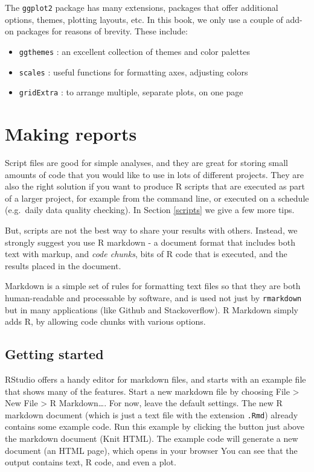 \documentclass[]{book}
\providecommand{\tightlist}{%
  \setlength{\itemsep}{0pt}\setlength{\parskip}{0pt}}
\begin{document}
The \texttt{ggplot2} package has many extensions, packages that offer additional options, themes, plotting layouts, etc. In this book, we only use a couple of add-on packages for reasons of brevity. These include:

\begin{itemize}
\tightlist
\item
  \texttt{ggthemes} : an excellent collection of themes and color palettes
\item
  \texttt{scales} : useful functions for formatting axes, adjusting colors
\item
  \texttt{gridExtra} : to arrange multiple, separate plots, on one page
\end{itemize}

\hypertarget{rmarkdown}{%
\section{Making reports}\label{rmarkdown}}

Script files are good for simple analyses, and they are great for storing small amounts of code that you would like to use in lots of different projects. They are also the right solution if you want to produce R scripts that are executed as part of a larger project, for example from the command line, or executed on a schedule (e.g.~daily data quality checking). In Section \ref{scripts} we give a few more tips.

But, scripts are not the best way to share your results with others. Instead, we strongly suggest you use R markdown - a document format that includes both text with markup, and \emph{code chunks}, bits of R code that is executed, and the results placed in the document.

Markdown is a simple set of rules for formatting text files so that they are both human-readable and processable by software, and is used not just by \texttt{rmarkdown} but in many applications (like Github and Stackoverflow). R Markdown simply adds R, by allowing code chunks with various options.

\hypertarget{getting-started}{%
\subsection{Getting started}\label{getting-started}}

RStudio offers a handy editor for markdown files, and starts with an example file that shows many of the features. Start a new markdown file by choosing File \textgreater{} New File \textgreater{} R Markdown\ldots{}. For now, leave the default settings. The new R markdown document (which is just a text file with the extension \texttt{.Rmd}) already contains some example code. Run this example by clicking the button just above the markdown document (Knit HTML). The example code will generate a new document (an HTML page), which opens in your browser You can see that the output contains text, R code, and even a plot.
\end{document}
